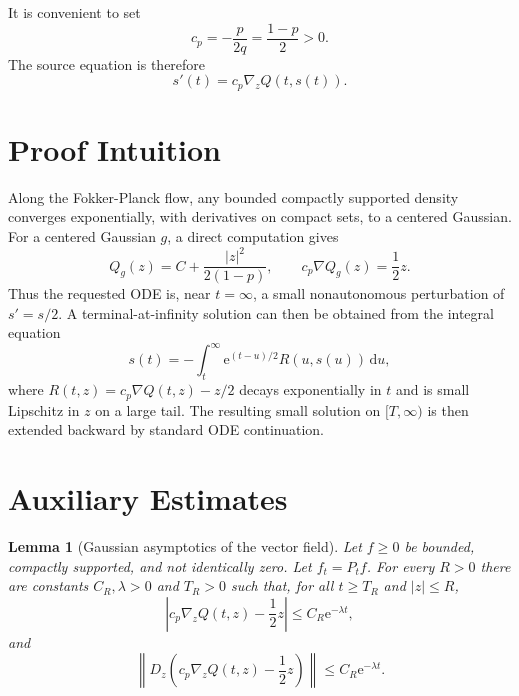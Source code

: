 \documentclass[11pt]{article}
\newtheorem{lemma}{Lemma}
\newcommand{\e}{\mathrm e}
\newcommand{\dd}{\,\mathrm d}
\newcommand{\grad}{\nabla}
\begin{document}
It is convenient to set
\[
  c_p=-\frac{p}{2q}=\frac{1-p}{2}>0.
\]
The source equation is therefore
\begin{equation}
\label{eq:ode}
  s'(t)=c_p\grad_z Q(t,s(t)).
\end{equation}

\section*{Proof Intuition}

Along the Fokker-Planck flow, any bounded compactly supported density converges
exponentially, with derivatives on compact sets, to a centered Gaussian. For a
centered Gaussian $g$, a direct computation gives
\[
  Q_g(z)=C+\frac{|z|^2}{2(1-p)}, \qquad
  c_p\grad Q_g(z)=\frac12 z.
\]
Thus the requested ODE is, near $t=\infty$, a small nonautonomous perturbation
of $s'=s/2$. A terminal-at-infinity solution can then be obtained from the
integral equation
\[
  s(t)=-\int_t^\infty \e^{(t-u)/2}R(u,s(u))\dd u,
\]
where $R(t,z)=c_p\grad Q(t,z)-z/2$ decays exponentially in $t$ and is small
Lipschitz in $z$ on a large tail. The resulting small solution on
$[T,\infty)$ is then extended backward by standard ODE continuation.

\section*{Auxiliary Estimates}

\begin{lemma}[Gaussian asymptotics of the vector field]
\label{lem:asymptotic}
Let $f\ge0$ be bounded, compactly supported, and not identically zero. Let
$f_t=P_tf$. For every $R>0$ there are constants $C_R,\lambda>0$ and
$T_R>0$ such that, for all $t\ge T_R$ and $|z|\le R$,
\[
  \left|c_p\grad_z Q(t,z)-\frac12 z\right|\le C_R\e^{-\lambda t},
\]
and
\[
  \left\|D_z\left(c_p\grad_z Q(t,z)-\frac12 z\right)\right\|
  \le C_R\e^{-\lambda t}.
\]
\end{lemma}
\end{document}
